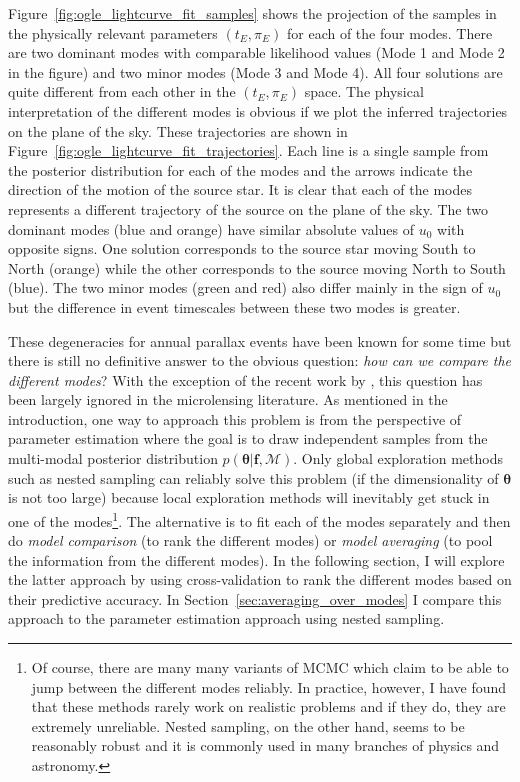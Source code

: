 \documentclass[12pt,dvipsnames]{report}
\renewcommand{\vec}[1]{\boldsymbol{\mathbf{#1}}}
\begin{document}
Figure~\ref{fig:ogle_lightcurve_fit_samples} shows the projection of the samples 
in the physically relevant parameters $(t_E, \pi_E)$ for each of the four modes.
There are two dominant modes with comparable likelihood values (Mode 1 and 
Mode 2 in the figure) and two minor modes (Mode 3 and Mode 4). All four solutions are 
quite different from each other in the $(t_E, \pi_E)$ space. 
The physical interpretation of the different modes
is obvious if we plot the inferred trajectories on the plane of the sky. These trajectories
are shown in Figure~\ref{fig:ogle_lightcurve_fit_trajectories}. Each line is a single 
sample from the posterior distribution for each of the modes and the arrows 
indicate the direction of the motion of the source star. It is clear that each of the modes
represents a different trajectory of the source on the plane of the sky. The two 
dominant modes (blue and orange) have similar absolute values of $u_0$  with opposite 
signs. One solution corresponds to the source star moving 
South to North (orange) while the other corresponds to the source moving North to South (blue).
The two minor modes (green and red) also differ mainly in the sign of $u_0$
but the difference in event timescales between these two modes is greater.

These degeneracies for annual parallax events have been known for some time 
\citep{2004ApJ...606..319G} but there is still no definitive answer to the obvious 
question: \emph{how can we compare the different modes}?
With the exception of the recent work by \citet{2022MNRAS.514.4845K}, this question has
been largely ignored in the microlensing literature. As mentioned in the introduction, one 
way to approach this problem is from the perspective of parameter estimation 
where the goal is to draw independent samples from the multi-modal posterior 
distribution $p(\vec\theta|\vec f, \mathcal{M})$. Only global exploration methods 
such as nested sampling can reliably solve this problem (if the dimensionality 
of $\vec\theta$ is not too large) because local exploration methods will inevitably
get stuck in one of the modes\footnote{
    Of course, there are many many variants of MCMC which claim to be able to jump
    between the different modes reliably. In practice, however, I have found that 
    these methods rarely work on realistic problems and if they do, they are extremely 
    unreliable. Nested sampling, on the other hand, seems to be reasonably robust and 
    it is commonly used in many branches of physics and astronomy.
}.
The alternative is to fit each of the modes separately and then do 
\emph{model comparison} (to rank the different modes) or \emph{model averaging}
(to pool the information from the different modes). In the following section, I will 
explore the latter approach by using cross-validation to rank the different modes
based on their predictive accuracy.
In Section~\ref{sec:averaging_over_modes} I compare this approach to the parameter 
estimation approach using nested sampling.
\end{document}
